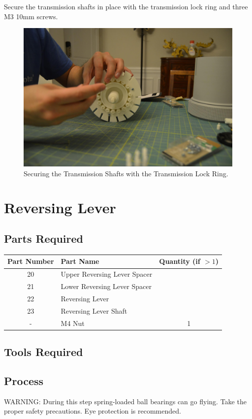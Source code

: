\documentclass[openany]{book}
\begin{document}
Secure the transmission shafts in place with the transmission lock ring and three M3 10mm screws.

\begin{figure}[!ht]
	\centering
	\includegraphics[width=.75\textwidth]{images/image15.jpg}
	\caption{Securing the Transmission Shafts with the Transmission Lock Ring.}
	\label{fig:image15}	
\end{figure}


\chapter{Reversing Lever}
\section{Parts Required}
\begin{table}[!ht]
	\centering
	\begin{tabular}{clc}
		Part Number & Part Name & Quantity (if $>1$) \\ \hline
		20 & Upper Reversing Lever Spacer & \\
		21 & Lower Reversing Lever Spacer & \\
		22 & Reversing Lever & \\
		23 & Reversing Lever Shaft & \\ \hline \hline
		- & M4 Nut & 1
	\end{tabular}
\end{table}


\section{Tools Required}

\section{Process}
WARNING: During this step spring-loaded ball bearings can go flying. Take the proper safety precautions. Eye protection is recommended.
\end{document}
